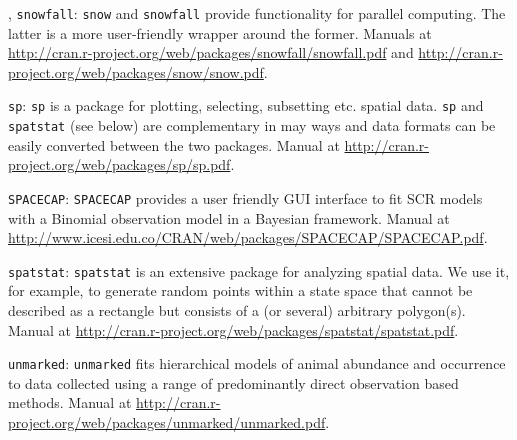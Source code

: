  {, {\tt snowfall}: }
\mbox{\tt snow} \citep{tierney_etal:2011} and \mbox{\tt snowfall} \citep{knaus:2010} provide functionality for parallel computing. The latter is a more user-friendly wrapper around the former. Manuals at \url{http://cran.r-project.org/web/packages/snowfall/snowfall.pdf} and \url{http://cran.r-project.org/web/packages/snow/snow.pdf}. 

{\flushleft \tt sp}:
\mbox{\tt sp}  \citep{pebesma_bivand:2011} is a package for plotting, selecting, subsetting etc. spatial data. \mbox{\tt sp}  and \mbox{\tt spatstat} (see below) are complementary in may ways and data formats can be easily converted between the two packages. Manual at \url{http://cran.r-project.org/web/packages/sp/sp.pdf}. 

{\flushleft \tt SPACECAP}:
 \mbox{\tt SPACECAP} \citep{gopalaswamy_etal:2012mee} provides a user friendly GUI interface to fit SCR models with a Binomial observation model in a Bayesian framework. Manual at \url{http://www.icesi.edu.co/CRAN/web/packages/SPACECAP/SPACECAP.pdf}.
 
{\flushleft \tt spatstat}:
\mbox{\tt spatstat} \citep{baddeley_turner:2005} is an extensive package for analyzing spatial data. We use it, for example, to generate random points within a state space that cannot be described as a rectangle but consists of a (or several) arbitrary polygon(s). Manual at \url{http://cran.r-project.org/web/packages/spatstat/spatstat.pdf}. 

{\flushleft \tt unmarked}: 
\mbox{\tt unmarked} \citep{fiske_chandler:2011} fits hierarchical models of animal abundance and occurrence to data collected using a range of predominantly direct observation based methods. Manual at \url{http://cran.r-project.org/web/packages/unmarked/unmarked.pdf}.



